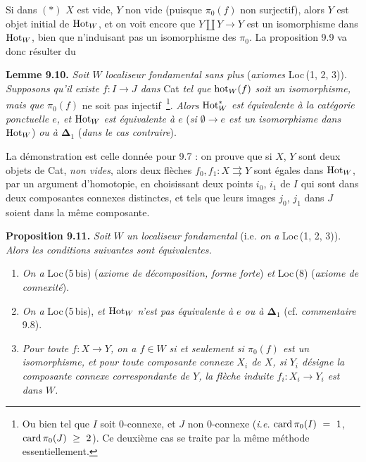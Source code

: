 Si dans $(*)$ $X$ est vide, $Y$ non vide (puisque $\pi_0(f)$ non surjectif), alors $Y$ est objet initial de $\mathrm{Hot}_W$, et on voit encore que $Y\amalg Y\longrightarrow Y$ est un isomorphisme dans $\mathrm{Hot}_W$, bien que n'induisant pas un isomorphisme des $\pi_0$. La proposition 9.9 va donc résulter du

\textbf{Lemme 9.10.} \textit{Soit $W$ localiseur fondamental sans plus} (\textit{axiomes} Loc\,(1, 2, 3)). \textit{Supposons qu'il existe $f:I\longrightarrow J$ dans} Cat \textit{tel que} $\mathrm{hot}_W(f)$ \textit{soit un isomorphisme, mais que $\pi_0(f)$} ne soit pas injectif~\footnote[56]{Ou bien tel que $I$ soit 0-connexe, et $J$ non 0-connexe (\textit{i.e.} $\card\pi_0(I)\ =\ 1$, $\card\pi_0(J)\ \geq\ 2$). Ce deuxième cas se traite par la même méthode essentiellement.}. \textit{Alors} $\mathrm{Hot}_W^*$ \textit{est équivalente à la catégorie ponctuelle $e$, et} $\mathrm{Hot}_W$ \textit{est équivalente à $e$} (\textit{si $\emptyset\longrightarrow e$ est un isomorphisme dans} $\mathrm{Hot}_W$) \textit{ou à $\boldsymbol{\Delta}_1$} (\textit{dans le cas contraire}).

La démonstration est celle donnée pour 9.7 : on prouve que si $X$, $Y$ sont deux objets de Cat, \textit{non vides}, alors deux flèches $f_0,f_1:X\rightrightarrows Y$ sont égales dans $\mathrm{Hot}_W$, par un argument d'homotopie, en choisissant deux points $i_0$, $i_1$ de $I$ qui sont dans deux composantes connexes distinctes, et tels que leurs images $j_0$, $j_1$ dans $J$ soient dans la même composante.

\textbf{Proposition 9.11.} \textit{Soit $W$ un localiseur fondamental} (i.e. \textit{on a} Loc\,(1, 2, 3)). \textit{Alors les conditions suivantes sont équivalentes.}
\begin{enumerate}[leftmargin=*]
\item[a)] \textit{On a} Loc\,(5\,bis) (\textit{axiome de décomposition, forme forte}) \textit{et} Loc\,(8) (\textit{axiome de connexité}).
\item[b)] \textit{On a} Loc\,(5\,bis), \textit{et} $\mathrm{Hot}_W$ \textit{n'est pas équivalente à $e$ ou à $\boldsymbol{\Delta}_1$} (cf. \textit{commentaire} 9.8).
\item[c)] \textit{Pour toute $f:X\longrightarrow Y$, on a $f\in W$ si et seulement si $\pi_0(f)$ est un isomorphisme, et pour toute composante connexe $X_i$ de $X$, si $Y_i$ désigne la composante connexe correspondante de $Y$, la flèche induite $f_i:X_i\longrightarrow Y_i$ est dans $W$.}
\end{enumerate}

